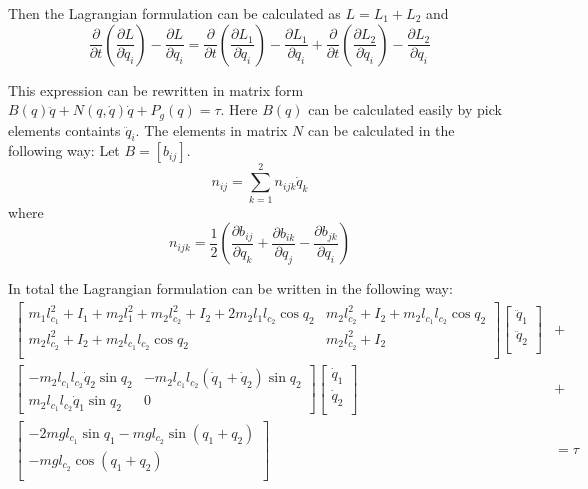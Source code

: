 \documentclass[a4paper,12pt,oneside,onecolumn]{article} %
\begin{document}
Then the Lagrangian formulation can be calculated as $L = L_1 + L_2$ and
\begin{equation}
\frac{\partial}{\partial t}(\frac{\partial L}{\partial \dot{q}_i}) - \frac{\partial L}{\partial q_i} = \frac{\partial}{\partial t}(\frac{\partial L_1}{\partial \dot{q}_i}) - \frac{\partial L_1}{\partial q_i} + \frac{\partial}{\partial t}(\frac{\partial L_2}{\partial \dot{q}_i}) - \frac{\partial L_2}{\partial q_i}
\end{equation}

This expression can be rewritten in matrix form $B(q)\ddot{q} + N(q, \dot{q})\dot{q}+P_g(q) = \tau$. Here $B(q)$ can be calculated easily by pick elements containts $\ddot{q}_i$. The elements in matrix $N$ can be calculated in the following way: 
Let $B=[b_{ij}]$. 
\begin{equation}
    n_{ij} = \sum_{k=1}^2 n_{ijk} \dot{q}_k 
\end{equation}
where
\begin{equation}
    n_{ijk} = \frac{1}{2} (\frac{\partial b_{ij}}{\partial q_k} + \frac{\partial b_{ik}}{\partial q_j} - \frac{\partial b_{jk}}{\partial q_i})
\end{equation}

In total the Lagrangian formulation can be written in the following way:
\begin{equation}
\begin{aligned}
    \begin{bmatrix}
    m_1 l_{c_1}^2 + I_1 + m_2 l_1^2 + m_2 l_{c_2}^2 + I_2 + 2 m_2 l_1 l_{c_2} \cos{q_2} &  m_2 l_{c_2}^2 + I_2 + m_2 l_{c_1} l_{c_2} \cos{q_2} \\
    m_2 l_{c_2}^2  + I_2 + m_2 l_{c_1} l_{c_2} \cos{q_2} &  m_2 l_{c_2}^2 + I_2 \\
    \end{bmatrix}
    \begin{bmatrix}
    \ddot{q}_1 \\ \ddot{q}_2 \\
    \end{bmatrix} & + \\
    \begin{bmatrix}
    - m_2 l_{c_1} l_{c_2} \dot{q}_2 \sin{q_2}  & - m_2 l_{c_1} l_{c_2} (\dot{q}_1+\dot{q}_2) \sin{q_2}  \\
      m_2 l_{c_1} l_{c_2}\dot{q}_1 \sin{q_2}  & 0
    \end{bmatrix}
    \begin{bmatrix}
    \dot{q}_1 \\ \dot{q}_2 \\
    \end{bmatrix} & + \\
    \begin{bmatrix}
    - 2 m g l_{c_1} \sin{q_1} - m g l_{c_2}   \sin{(q_1+q_2)} \\  - m g l_{c_2} \cos{(q_1 + q_2)} \\
    \end{bmatrix} & = \tau
\end{aligned}
\end{equation}
\end{document}
